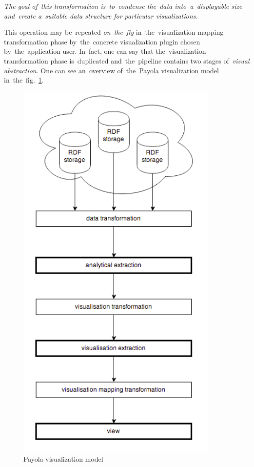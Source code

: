 \emph{The goal of~this transformation is~to~condense the~data into~a~displayable size and~create
a~suitable data structure for particular visualizations.}

This operation may be~repeated \emph{on--the--fly} in~the~visualization mapping transformation
phase by~the~concrete visualization plugin chosen by~the~application user. In~fact, one can
say that the~visualization transformation phase is~duplicated and~the~pipeline contains two
stages of~\emph{visual abstraction}. One can see an~overview of~the~Payola 
visualization model in~the~fig.~\ref{fig:payola_model}.

\begin{figure}
	\centering
	\includegraphics[width=100mm]{img/payola_model.png}
	\caption{Payola visualization model}
	\label{fig:payola_model}
\end{figure}

